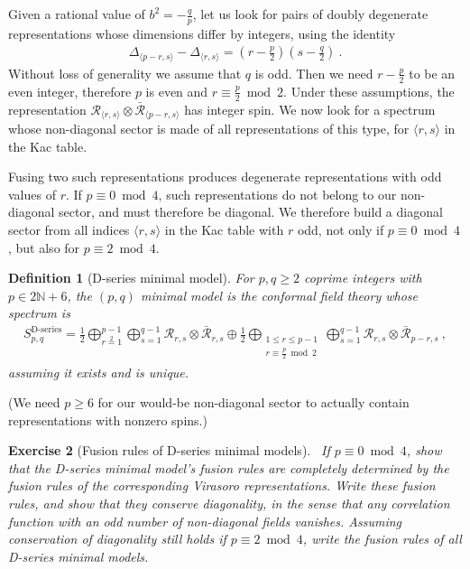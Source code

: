 \documentclass[12pt, a4paper]{article}
\theoremstyle{break}
\newtheorem{exo}{Exercise}[section]
\newtheorem{defn}[exo]{Definition}
\begin{document}
Given a rational value of $b^2=-\frac{q}{p}$, let us look for pairs of doubly degenerate representations whose dimensions differ by integers, using the identity
\begin{align}
 \Delta_{\langle p-r,s\rangle} -\Delta_{\langle r,s\rangle}= \left(r-\frac{p}{2}\right)\left(s-\frac{q}{2}\right)\ .
\end{align}
Without loss of generality we assume that $q$ is odd. Then we need $r-\frac{p}{2}$ to be an even integer, therefore $p$ is even and $r\equiv\frac{p}{2}\bmod 2$. Under these assumptions, the representation $\mathcal{R}_{\langle r,s\rangle}\otimes \bar{\mathcal{R}}_{\langle p-r,s\rangle}$ has integer spin. We now look for a spectrum whose non-diagonal sector is made of all representations of this type, for $\langle r,s\rangle$ in the Kac table.

Fusing two such representations produces degenerate representations with odd values of $r$. If $p\equiv 0\bmod 4$, such representations do not belong to our non-diagonal sector, and must therefore be diagonal. We therefore build a diagonal sector from all indices $\langle r,s\rangle$ in the Kac table with $r$ odd, not only if $p\equiv 0\bmod 4$, but also for $p\equiv 2\bmod 4$. 

\begin{defn}[D-series minimal model]
 For $p,q\geq 2$ coprime integers with $p\in 2\mathbb{N}+6$, the $(p,q)$ minimal model is the conformal field theory whose spectrum is 
\begin{align}
 S_{p,q}^\text{D-series} = \frac12 \bigoplus_{r\overset{2}{=}1}^{p-1} \bigoplus_{s=1}^{q-1} \mathcal{R}_{ r,s} \otimes \bar{\mathcal{R}}_{r,s}\oplus \frac12\bigoplus_{\substack{1\leq r\leq p-1 \\ r\equiv \frac{p}{2}\bmod 2}} \bigoplus_{s=1}^{q-1} \mathcal{R}_{r,s} \otimes \bar{\mathcal{R}}_{p-r,s}\ ,
 \label{eq:sds}
\end{align}
assuming it exists and is unique.
\end{defn}
(We need $p\geq 6$ for our would-be non-diagonal sector to actually contain representations with nonzero spins.)

\begin{exo}[Fusion rules of D-series minimal models]
~\label{exo:frd}
 If $p\equiv 0\bmod 4$, show that the D-series minimal model's fusion rules are completely determined by the fusion rules of the corresponding Virasoro representations. Write these fusion rules, and show that they conserve diagonality, in the sense that any correlation function with an odd number of non-diagonal fields vanishes. Assuming conservation of diagonality still holds if $p\equiv 2\bmod 4$, write the fusion rules of all D-series minimal models.
\end{exo}
\end{document}
